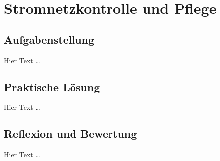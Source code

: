 \chapter{Stromnetzkontrolle und Pflege}
\label{cha:Stromnetzkontrolle}

\section{Aufgabenstellung}

Hier Text ... 

\section{Praktische Lösung}

Hier Text ...

\section{Reflexion und Bewertung}

Hier Text ...

\clearpage
